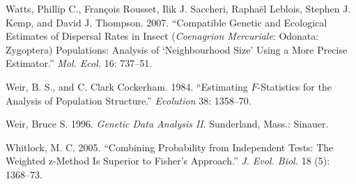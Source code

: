 \documentclass[
  12pt,
]{book}
\newlength{\cslhangindent}
\newlength{\cslentryspacingunit} %
\newenvironment{CSLReferences}[2] %
 {%
  \setlength{\parindent}{0pt}
  \ifodd #1
  \let\oldpar\par
  \def\par{\hangindent=\cslhangindent\oldpar}
  \fi
  \setlength{\parskip}{#2\cslentryspacingunit}
 }%
 {}
\begin{document}
\begin{CSLReferences}{1}{0}
\leavevmode{}%
Watts, Phillip C., François Rousset, Ilik J. Saccheri, Raphaël Leblois, Stephen J. Kemp, and David J. Thompson. 2007. {``Compatible Genetic and Ecological Estimates of Dispersal Rates in Insect (\emph{Coenagrion Mercuriale}: Odonata: Zygoptera) Populations: Analysis of {`Neighbourhood Size'} Using a More Precise Estimator.''} \emph{Mol. Ecol.} 16: 737--51.

\leavevmode{}%
Weir, B. S., and C. Clark Cockerham. 1984. {``Estimating \(F\)-Statistics for the Analysis of Population Structure.''} \emph{Evolution} 38: 1358--70.

\leavevmode{}%
Weir, Bruce S. 1996. \emph{Genetic Data Analysis II}. Sunderland, Mass.: Sinauer.

\leavevmode{}%
Whitlock, M. C. 2005. {``Combining Probability from Independent Tests: The Weighted z-Method Is Superior to Fisher's Approach.''} \emph{J. Evol. Biol.} 18 (5): 1368--73.

\end{CSLReferences}
\end{document}
